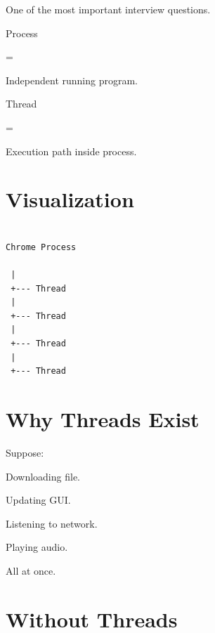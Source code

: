 \documentclass[11pt,a4paper]{book}
\begin{document}
One of the most important
interview questions.


Process

=

Independent running program.


Thread

=

Execution path inside process.


\section{Visualization}

\begin{verbatim}

Chrome Process

 |
 +--- Thread
 |
 +--- Thread
 |
 +--- Thread
 |
 +--- Thread

\end{verbatim}


\section{Why Threads Exist}

Suppose:


Downloading file.


Updating GUI.


Listening to network.


Playing audio.


All at once.


\section{Without Threads}
\end{document}
